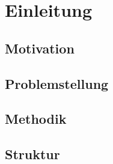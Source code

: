 \chapter{Einleitung}

\section{Motivation}

\section{Problemstellung}

\section{Methodik}

\section{Struktur}
